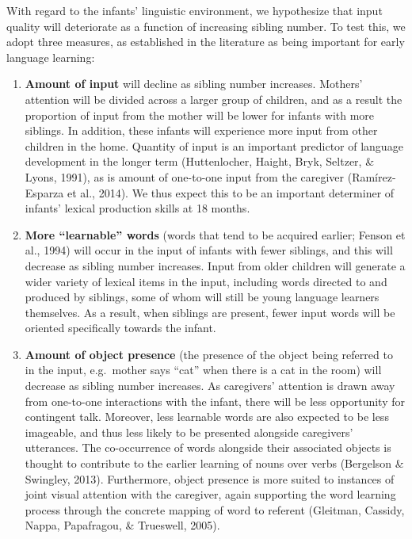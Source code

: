 \documentclass[
  english,
  man,floatsintext]{apa6}
\begin{document}
With regard to the infants' linguistic environment, we hypothesize that input quality will deteriorate as a function of increasing sibling number. To test this, we adopt three measures, as established in the literature as being important for early language learning:

\begin{enumerate}
\def\labelenumi{\arabic{enumi})}
\item
  \textbf{Amount of input} will decline as sibling number increases. Mothers' attention will be divided across a larger group of children, and as a result the proportion of input from the mother will be lower for infants with more siblings. In addition, these infants will experience more input from other children in the home. Quantity of input is an important predictor of language development in the longer term (Huttenlocher, Haight, Bryk, Seltzer, \& Lyons, 1991), as is amount of one-to-one input from the caregiver (Ramírez-Esparza et al., 2014). We thus expect this to be an important determiner of infants' lexical production skills at 18 months.
\item
  \textbf{More \enquote{learnable} words} (words that tend to be acquired earlier; Fenson et al., 1994) will occur in the input of infants with fewer siblings, and this will decrease as sibling number increases. Input from older children will generate a wider variety of lexical items in the input, including words directed to and produced by siblings, some of whom will still be young language learners themselves. As a result, when siblings are present, fewer input words will be oriented specifically towards the infant.
\item
  \textbf{Amount of object presence} (the presence of the object being referred to in the input, e.g.~mother says \enquote{cat} when there is a cat in the room) will decrease as sibling number increases. As caregivers' attention is drawn away from one-to-one interactions with the infant, there will be less opportunity for contingent talk. Moreover, less learnable words are also expected to be less imageable, and thus less likely to be presented alongside caregivers' utterances. The co-occurrence of words alongside their associated objects is thought to contribute to the earlier learning of nouns over verbs (Bergelson \& Swingley, 2013). Furthermore, object presence is more suited to instances of joint visual attention with the caregiver, again supporting the word learning process through the concrete mapping of word to referent (Gleitman, Cassidy, Nappa, Papafragou, \& Trueswell, 2005).
\end{enumerate}
\end{document}

